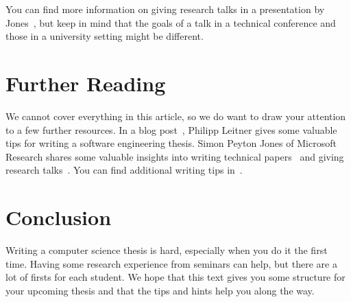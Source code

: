 \documentclass[a4paper]{article}
\begin{document}
You can find more information on giving research talks in a presentation by Jones~\cite{jones-talk}, but keep in mind that the goals of a talk in a technical conference and those in a university setting might be different.

\section{Further Reading}
\label{sec:resources}

We cannot cover everything in this article, so we do want to draw your attention to a few further resources.
In a blog post~\cite{leitner}, Philipp Leitner gives some valuable tips for writing a software engineering thesis.
Simon Peyton Jones of Microsoft Research shares some valuable insights into writing technical papers~\cite{jones-paper} and giving research talks~\cite{jones-talk}.
You can find additional writing tips in~\cite{patterson-writing,ernst-writing,schulzrinne-writing}.

\section{Conclusion}
\label{sec:conclusion}

Writing a computer science thesis is hard, especially when you do it the first time.
Having some research experience from seminars can help, but there are a lot of firsts for each student.
We hope that this text gives you some structure for your upcoming thesis and that the tips and hints help you along the way.

\printbibliography
\end{document}
